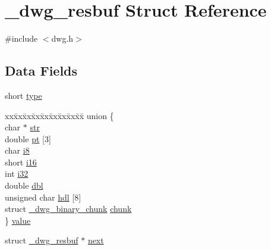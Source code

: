\hypertarget{struct__dwg__resbuf}{\section{\-\_\-dwg\-\_\-resbuf \-Struct \-Reference}
\label{struct__dwg__resbuf}
}


{\ttfamily \#include $<$dwg.\-h$>$}

\subsection*{\-Data \-Fields}
\begin{DoxyCompactItemize}
\item 
short \hyperlink{struct__dwg__resbuf_a226066855831815f2df282214a678bd2}{type}
\item 
\begin{tabbing}
xx\=xx\=xx\=xx\=xx\=xx\=xx\=xx\=xx\=\kill
union \{\\
\>char $\ast$ \hyperlink{struct__dwg__resbuf_a861556bab1d49fe104ade77486bf9204}{str}\\
\>double \hyperlink{struct__dwg__resbuf_a1b6c76927f901d8e6c7ef12b4be5a67d}{pt} \mbox{[}3\mbox{]}\\
\>char \hyperlink{struct__dwg__resbuf_a30dff0d6577261162488f9a7e199469e}{i8}\\
\>short \hyperlink{struct__dwg__resbuf_a01dd0998f1365f76a8bc1989a8b39737}{i16}\\
\>int \hyperlink{struct__dwg__resbuf_a191ea9a7101073366ec7d1ef849956d5}{i32}\\
\>double \hyperlink{struct__dwg__resbuf_a901b9c0430be50c8428813f9980bfedf}{dbl}\\
\>unsigned char \hyperlink{struct__dwg__resbuf_a52d96254caa6fb86b4ddee5c8199a130}{hdl} \mbox{[}8\mbox{]}\\
\>struct \hyperlink{struct__dwg__binary__chunk}{\_dwg\_binary\_chunk} \hyperlink{struct__dwg__resbuf_ac17eeacf7a7d393be6d599d6a5eefff6}{chunk}\\
\} \hyperlink{struct__dwg__resbuf_a5270cd5e753e593c02035ed508e92338}{value}\\

\end{tabbing}\item 
struct \hyperlink{struct__dwg__resbuf}{\-\_\-dwg\-\_\-resbuf} $\ast$ \hyperlink{struct__dwg__resbuf_a0afd91fd6517fbc08871040dd9f7027c}{next}
\end{DoxyCompactItemize}


